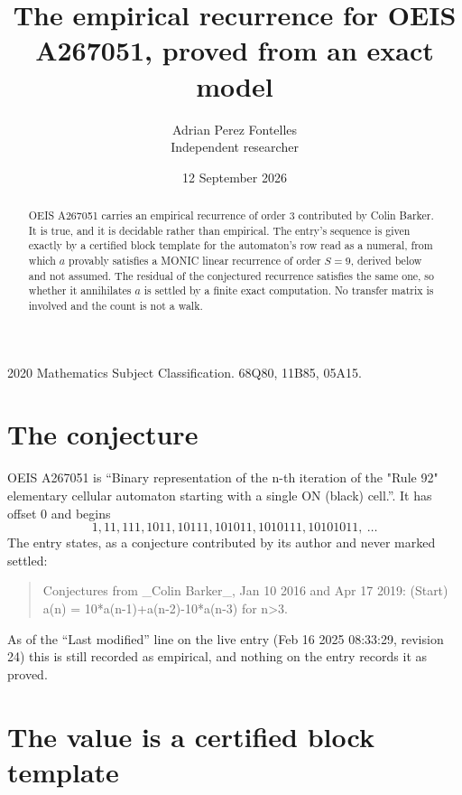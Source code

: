 \documentclass[11pt,a4paper]{article}
\title{The empirical recurrence for OEIS A267051, proved from an exact model}
\author{Adrian Perez Fontelles\\ \small Independent researcher}
\date{12 September 2026}
\theoremstyle{plain}
\theoremstyle{definition}
\begin{document}
\maketitle

\begin{abstract}
OEIS A267051 carries an empirical recurrence of order $3$ contributed by Colin Barker. It is true, and it is
decidable rather than empirical. The entry's sequence is given exactly by a certified block template for the automaton's row read as a numeral, from
which $a$ provably satisfies a MONIC linear recurrence of order $S=9$, derived below and not
assumed. The residual of the conjectured recurrence satisfies the same one, so whether it
annihilates $a$ is settled by a finite exact computation. No transfer matrix is involved and
the count is not a walk.
\end{abstract}

\noindent\small 2020 Mathematics Subject Classification. 68Q80, 11B85, 05A15.\normalsize

\section{The conjecture}

OEIS A267051 is ``Binary representation of the n-th iteration of the "Rule 92" elementary cellular automaton starting with a single ON (black) cell.''. It has offset $0$ and begins
\[
1, 11, 111, 1011, 10111, 101011, 1010111, 10101011,\ \dots
\]
The entry states, as a conjecture contributed by its author and never marked settled:
\begin{quote}
Conjectures from \_Colin Barker\_, Jan 10 2016 and Apr 17 2019: (Start) a(n) = 10*a(n-1)+a(n-2)-10*a(n-3) for n>3.
\end{quote}
As of the ``Last modified'' line on the live entry (Feb 16 2025 08:33:29, revision 24)
this is still recorded as empirical, and nothing on the entry records it as proved.

\section{The value is a certified block template}
\end{document}
